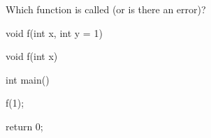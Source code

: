 Which function is called (or is there an error)?



\begin{consolethree}[escapeinside=||]

void f(int x, int y = 1) {}

void f(int x) {}



int main()

{

    f(1);

    return 0;

}

\end{consolethree}

